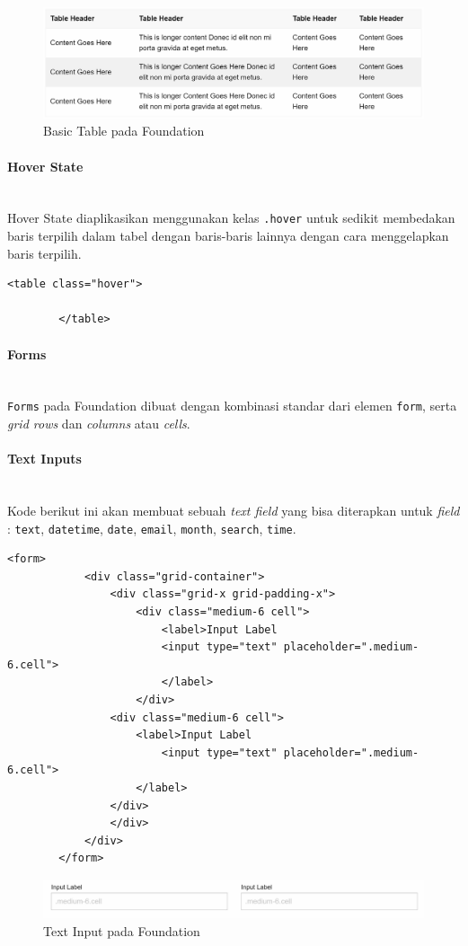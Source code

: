 \documentclass[a4paper,twoside]{article}
\newcommand{\myparagraph}[1]{\paragraph{#1}\mbox{}\\}
\begin{document}
\begin{enumerate}
		\begin{figure} [H]
			\centering  
			\includegraphics[scale=0.7]{basictable_zurb.png}  
			\caption{Basic Table pada Foundation}
		\end{figure}
		
		\myparagraph{Hover State}
		Hover State diaplikasikan menggunakan kelas \texttt{.hover} untuk sedikit membedakan baris terpilih dalam tabel dengan baris-baris lainnya dengan cara menggelapkan baris terpilih.
		\begin{lstlisting}[frame=single] 
		<table class="hover">
		
		</table>
		\end{lstlisting}
		
				
		\myparagraph{Forms}
		\texttt{Forms} pada Foundation dibuat dengan kombinasi standar dari elemen \texttt{form}, serta \textit{grid rows} dan \textit{columns} atau \textit{cells}. 
		
		\myparagraph{Text Inputs}
		Kode berikut ini akan membuat sebuah \textit{text field} yang bisa diterapkan untuk \textit{field} : \colorbox{mygray}{\texttt{text}}, \colorbox{mygray}{\texttt{datetime}}, \colorbox{mygray}{\texttt{date}}, \colorbox{mygray}{\texttt{email}}, \colorbox{mygray}{\texttt{month}}, \colorbox{mygray}{\texttt{search}}, \colorbox{mygray}{\texttt{time}}.
		
		\begin{lstlisting}[frame=single] 
		<form>
			<div class="grid-container">
				<div class="grid-x grid-padding-x">
					<div class="medium-6 cell">
						<label>Input Label
						<input type="text" placeholder=".medium-6.cell">
						</label>
					</div>
				<div class="medium-6 cell">
					<label>Input Label
						<input type="text" placeholder=".medium-6.cell">
					</label>
				</div>
				</div>
			</div>
		</form>
		\end{lstlisting}
		
		\begin{figure} [H]
			\centering  
			\includegraphics[scale=0.7]{input_zurb.png}  
			\caption{Text Input pada Foundation}
			\label{fig:gridbasic_zurb} 
		\end{figure}
		

\end{enumerate}
\end{document}
